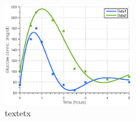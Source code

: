 \documentclass{article}
\newcommand{\figWidth}{0.5\textwidth}
\begin{document}
\begin{figure}[h!t!]
   \centering
   \includegraphics[width=\figWidth]{figs/ackermanTest1}
	\vspace{-5pt}
   \caption{textetx}
   \label{Fig:ackerResult}
\end{figure}



\end{document}
